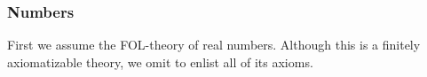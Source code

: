 \documentclass[xcolor=x11names]{beamer}
\newcommand{\bemph}[1] {{\color{DeepSkyBlue3}{#1}}}
\newcommand{\magyi}[1]{\textup{\bemph{\tiny #1}}}
\begin{document}

\begin{frame}[t]
\frametitle{Numbers}
\footnotesize
First we assume the FOL-theory of real numbers. Although this is a finitely axiomatizable theory, we omit to enlist all of its axioms.
\end{frame}
\end{document}
